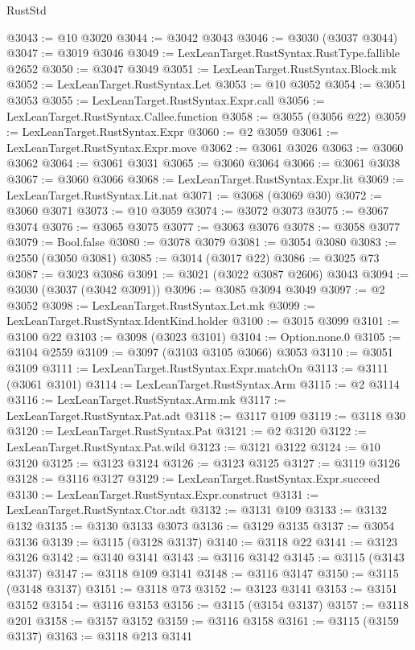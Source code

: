 \begin{lexlean}{RustStd}
\begin{coremodule}
@3043 := @10 @3020
@3044 := @3042 @3043
@3046 := @3030 (@3037 @3044)
@3047 := @3019 @3046
@3049 := LexLeanTarget.RustSyntax.RustType.fallible @2652
@3050 := @3047 @3049
@3051 := LexLeanTarget.RustSyntax.Block.mk
@3052 := LexLeanTarget.RustSyntax.Let
@3053 := @10 @3052
@3054 := @3051 @3053
@3055 := LexLeanTarget.RustSyntax.Expr.call
@3056 := LexLeanTarget.RustSyntax.Callee.function
@3058 := @3055 (@3056 @22)
@3059 := LexLeanTarget.RustSyntax.Expr
@3060 := @2 @3059
@3061 := LexLeanTarget.RustSyntax.Expr.move
@3062 := @3061 @3026
@3063 := @3060 @3062
@3064 := @3061 @3031
@3065 := @3060 @3064
@3066 := @3061 @3038
@3067 := @3060 @3066
@3068 := LexLeanTarget.RustSyntax.Expr.lit
@3069 := LexLeanTarget.RustSyntax.Lit.nat
@3071 := @3068 (@3069 @30)
@3072 := @3060 @3071
@3073 := @10 @3059
@3074 := @3072 @3073
@3075 := @3067 @3074
@3076 := @3065 @3075
@3077 := @3063 @3076
@3078 := @3058 @3077
@3079 := Bool.false
@3080 := @3078 @3079
@3081 := @3054 @3080
@3083 := @2550 (@3050 @3081)
@3085 := @3014 (@3017 @22)
@3086 := @3025 @73
@3087 := @3023 @3086
@3091 := @3021 (@3022 @3087 @2606) @3043
@3094 := @3030 (@3037 (@3042 @3091))
@3096 := @3085 @3094 @3049
@3097 := @2 @3052
@3098 := LexLeanTarget.RustSyntax.Let.mk
@3099 := LexLeanTarget.RustSyntax.IdentKind.holder
@3100 := @3015 @3099
@3101 := @3100 @22
@3103 := @3098 (@3023 @3101)
@3104 := Option.none.{0}
@3105 := @3104 @2559
@3109 := @3097 (@3103 @3105 @3066) @3053
@3110 := @3051 @3109
@3111 := LexLeanTarget.RustSyntax.Expr.matchOn
@3113 := @3111 (@3061 @3101)
@3114 := LexLeanTarget.RustSyntax.Arm
@3115 := @2 @3114
@3116 := LexLeanTarget.RustSyntax.Arm.mk
@3117 := LexLeanTarget.RustSyntax.Pat.adt
@3118 := @3117 @109
@3119 := @3118 @30
@3120 := LexLeanTarget.RustSyntax.Pat
@3121 := @2 @3120
@3122 := LexLeanTarget.RustSyntax.Pat.wild
@3123 := @3121 @3122
@3124 := @10 @3120
@3125 := @3123 @3124
@3126 := @3123 @3125
@3127 := @3119 @3126
@3128 := @3116 @3127
@3129 := LexLeanTarget.RustSyntax.Expr.succeed
@3130 := LexLeanTarget.RustSyntax.Expr.construct
@3131 := LexLeanTarget.RustSyntax.Ctor.adt
@3132 := @3131 @109
@3133 := @3132 @132
@3135 := @3130 @3133 @3073
@3136 := @3129 @3135
@3137 := @3054 @3136
@3139 := @3115 (@3128 @3137)
@3140 := @3118 @22
@3141 := @3123 @3126
@3142 := @3140 @3141
@3143 := @3116 @3142
@3145 := @3115 (@3143 @3137)
@3147 := @3118 @109 @3141
@3148 := @3116 @3147
@3150 := @3115 (@3148 @3137)
@3151 := @3118 @73
@3152 := @3123 @3141
@3153 := @3151 @3152
@3154 := @3116 @3153
@3156 := @3115 (@3154 @3137)
@3157 := @3118 @201
@3158 := @3157 @3152
@3159 := @3116 @3158
@3161 := @3115 (@3159 @3137)
@3163 := @3118 @213 @3141

\end{coremodule}
\end{lexlean}
